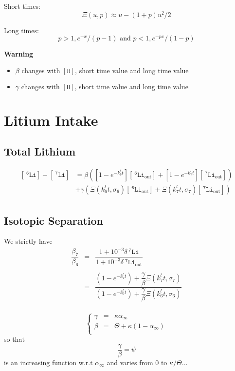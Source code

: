 \documentclass[aps,onecolumn,12pt]{revtex4}
\newcommand{\mychem}[1]{\mathtt{#1}}
\newcommand{\myconc}[1]{\left\lbrack{#1}\right\rbrack}
\newcommand{\spLi}[1]{{~^{\mychem{#1}}\mychem{Li}}}
\newcommand{\Li}[1]{\myconc{\spLi{#1}}}
\newcommand{\spLiOut}[1]{{\spLi{#1}}_{\mathrm{out}}}
\newcommand{\LiOut}[1]{\myconc{\spLiOut{#1}}}
\newcommand{\spproton}{\mychem{H}}
\newcommand{\proton}{\myconc{\spproton}}
\newcommand{\deltaLi}{ {\delta\!\!\!\spLi{7}} }
\newcommand{\deltaLiOut}{{\deltaLi}_{\mathrm{out}}}
\begin{document}
Short times: 
$$
	\Xi(u,p) \approx u - (1+p)u^2/2
$$

Long times:
$$
	p>1, e^{-x}/(p-1) \text{ and } p<1, e^{-px}/(1-p)
$$


\centerline{\bf Warning}
\begin{itemize}
	\item $\beta$ changes with $\proton$, short time value and long time value
	\item $\gamma$ changes with $\proton$, short time value and long time value
\end{itemize}

\section{Litium Intake}
\subsection{Total Lithium}
	
\begin{equation}
\begin{array}{rl}
	\Li{6} + \Li{7} & = \beta \left( \left[1-e^{-k_6^l t}  \right] \LiOut{6} + \left[1-e^{-k_7^l t}  \right] \LiOut{7} \right)\\
	 & + \gamma\left(\Xi\left(k_6^lt,\sigma_6\right) \LiOut{6} +  \Xi\left(k_7^lt,\sigma_7\right) \LiOut{7} \right)\\
\end{array}
\end{equation}
	
\subsection{Isotopic Separation}
We strictly have
\begin{equation}
\begin{array}{rcl}
	\dfrac{\beta_7}{\beta_6} & = & \dfrac{1+10^{-3}\deltaLi}{1+10^{-3}\deltaLiOut}\\
	\\
	& = & \dfrac{\left(1-e^{-k_7^lt}\right)+\dfrac{\gamma}{\beta}\Xi\left(k_7^lt,\sigma_7\right)}
	{\left(1-e^{-k_6^lt}\right)+\dfrac{\gamma}{\beta}\Xi\left(k_6^lt,\sigma_6\right)}\\
\end{array}
\end{equation}

\begin{equation}
\left\lbrace
	\begin{array}{rcl}
	\gamma & = & \kappa \alpha_\infty \\
	\beta  & = & \Theta + \kappa (1-\alpha_\infty)\\
	\end{array}	
\right.
\end{equation}
so that 
\begin{equation}
	\dfrac{\gamma}{\beta} = \psi
\end{equation}
is an increasing function w.r.t $\alpha_\infty$ and varies from $0$ to $\kappa/\Theta$...
\end{document}
